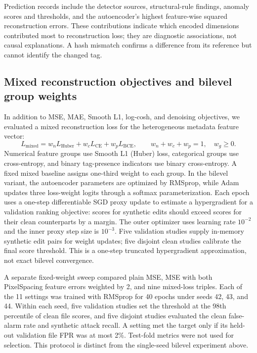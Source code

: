 \documentclass[journal]{IEEEtran}
\begin{document}
  Prediction records include the detector sources, structural-rule findings, anomaly scores and thresholds, and the autoencoder's highest feature-wise squared reconstruction errors. These contributions indicate which encoded dimensions contributed most to reconstruction loss; they are diagnostic associations, not causal explanations. A hash mismatch confirms a difference from its reference but cannot identify the changed tag.

  \subsection{Mixed reconstruction objectives and bilevel group weights}
  In addition to MSE, MAE, Smooth L1, log-cosh, and denoising objectives, we evaluated a mixed reconstruction loss for the heterogeneous metadata feature vector:
  \begin{equation}
  L_{\mathrm{mixed}}=w_nL_{\mathrm{Huber}}+w_cL_{\mathrm{CE}}+w_pL_{\mathrm{BCE}},\qquad
  w_n+w_c+w_p=1,\quad w_g\geq0.
  \end{equation}
  Numerical feature groups use Smooth L1 (Huber) loss, categorical groups use cross-entropy, and binary tag-presence indicators use binary cross-entropy. A fixed mixed baseline assigns one-third weight to each group. In the bilevel variant, the autoencoder parameters are optimized by RMSprop, while Adam updates three loss-weight logits through a softmax parameterization. Each epoch uses a one-step differentiable SGD proxy update to estimate a hypergradient for a validation ranking objective: scores for synthetic edits should exceed scores for their clean counterparts by a margin. The outer optimizer uses learning rate $10^{-2}$ and the inner proxy step size is $10^{-3}$. Five validation studies supply in-memory synthetic edit pairs for weight updates; five disjoint clean studies calibrate the final score threshold. This is a one-step truncated hypergradient approximation, not exact bilevel convergence.

  A separate fixed-weight sweep compared plain MSE, MSE with both PixelSpacing feature errors weighted by 2, and nine mixed-loss triples. Each of the 11 settings was trained with RMSprop for 40 epochs under seeds 42, 43, and 44. Within each seed, five validation studies set the threshold at the 98th percentile of clean file scores, and five disjoint studies evaluated the clean false-alarm rate and synthetic attack recall. A setting met the target only if its held-out validation file FPR was at most 2\%. Test-fold metrics were not used for selection. This protocol is distinct from the single-seed bilevel experiment above.
  
\end{document}

